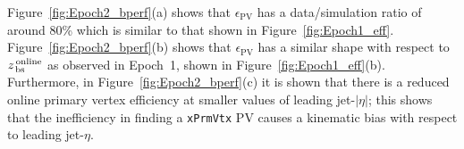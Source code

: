 Figure~\ref{fig:Epoch2_bperf}(a) shows that $\epsilon_{\text{PV}}$ has a data/simulation ratio of around 80\%  which is similar to that shown in Figure~\ref{fig:Epoch1_eff}.
Figure~\ref{fig:Epoch2_bperf}(b) shows that $\epsilon_{\text{PV}}$ has a similar shape with respect to  $z_{\,\text{bs}}^{\text{\,online}}$ as observed in Epoch~1,
shown in Figure~\ref{fig:Epoch1_eff}(b).
Furthermore, in Figure~\ref{fig:Epoch2_bperf}(c) it is shown that there is a reduced online primary vertex efficiency at smaller values of leading jet-$|\eta|$;
this shows that the inefficiency in finding a \verb|xPrmVtx| PV causes a kinematic bias with respect to leading jet-$\eta$. %

\begin{figure}[!ht]
\begin{center}
  \captionsetup[subfigure]{aboveskip=0pt,justification=centering}
  \hspace{-0.5cm}
  \\

\end{center}
\end{figure}
